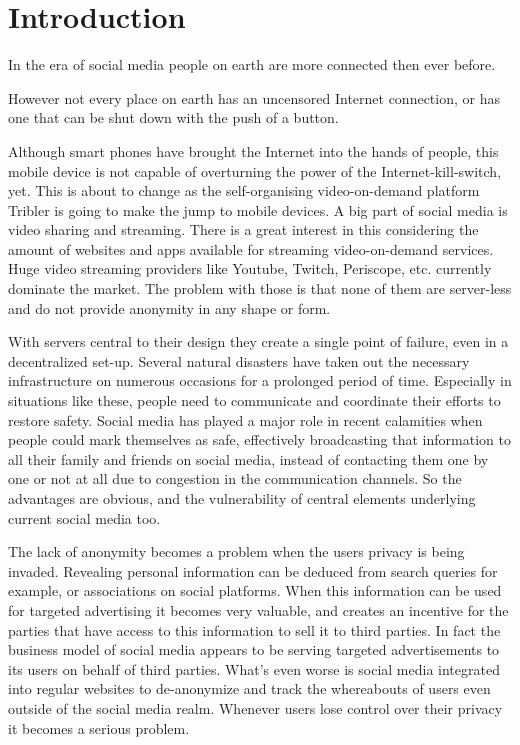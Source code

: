 

\chapter{Introduction}

In the era of social media people on earth are more connected then ever before.

However not every place on earth has an uncensored Internet connection, or has one that can be shut down with the push of a button.

Although smart phones have brought the Internet into the hands of people, this mobile device is not capable of overturning the power of the Internet-kill-switch, yet.
This is about to change as the self-organising video-on-demand platform Tribler is going to make the jump to mobile devices.
A big part of social media is video sharing and streaming.
There is a great interest in this considering the amount of websites and apps available for streaming video-on-demand services.
Huge video streaming providers like Youtube, Twitch, Periscope, etc. currently dominate the market.
The problem with those is that none of them are server-less and do not  provide anonymity in any shape or form.

With servers central to their design they create a single point of failure, even in a decentralized set-up.
Several natural disasters have taken out the necessary infrastructure on numerous occasions for a prolonged period of time.
Especially in situations like these, people need to communicate and coordinate their efforts to restore safety.
Social media has played a major role in recent calamities when people could mark themselves as safe, effectively broadcasting that information to all their family and friends on social media, instead of contacting them one by one or not at all due to congestion in the communication channels.
So the advantages are obvious, and the vulnerability of central elements underlying current social media too.

The lack of anonymity becomes a problem when the users privacy is being invaded.
Revealing personal information can be deduced from search queries for example, or associations on social platforms.
When this information can be used for targeted advertising it becomes very valuable, and creates an incentive for the parties that have access to this information to sell it to third parties.
In fact the business model of social media appears to be serving targeted advertisements to its users on behalf of third parties.
What's even worse is social media integrated into regular websites to de-anonymize and track the whereabouts of users even outside of the social media realm.
Whenever users lose control over their privacy it becomes a serious problem.


